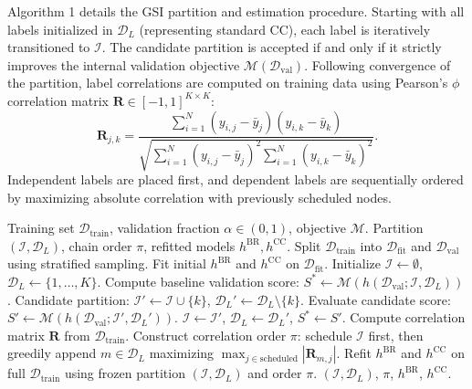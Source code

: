 \documentclass[conference]{IEEEtran}
\begin{document}
Algorithm 1 details the GSI partition and estimation procedure. Starting with all labels initialized in $\mathcal{D}_L$ (representing standard CC), each label is iteratively transitioned to $\mathcal{I}$. The candidate partition is accepted if and only if it strictly improves the internal validation objective $\mathcal{M}(\mathcal{D}_{\text{val}})$. Following convergence of the partition, label correlations are computed on training data using Pearson's $\phi$ correlation matrix $\mathbf{R} \in [-1, 1]^{K \times K}$:
\begin{equation}
    \mathbf{R}_{j, k} = \frac{\sum_{i=1}^N (y_{i,j} - \bar{y}_j)(y_{i,k} - \bar{y}_k)}{\sqrt{\sum_{i=1}^N (y_{i,j} - \bar{y}_j)^2 \sum_{i=1}^N (y_{i,k} - \bar{y}_k)^2}}.
\end{equation}
Independent labels are placed first, and dependent labels are sequentially ordered by maximizing absolute correlation with previously scheduled nodes.

\begin{algorithm}[htbp]
\caption{Greedy Selection of Independent Labels (GSI)}
\begin{algorithmic}[1]
\REQUIRE Training set $\mathcal{D}_{\text{train}}$, validation fraction $\alpha \in (0, 1)$, objective $\mathcal{M}$.
\ENSURE Partition $(\mathcal{I}, \mathcal{D}_L)$, chain order $\pi$, refitted models $h^{\text{BR}}, h^{\text{CC}}$.
\STATE Split $\mathcal{D}_{\text{train}}$ into $\mathcal{D}_{\text{fit}}$ and $\mathcal{D}_{\text{val}}$ using stratified sampling.
\STATE Fit initial $h^{\text{BR}}$ and $h^{\text{CC}}$ on $\mathcal{D}_{\text{fit}}$.
\STATE Initialize $\mathcal{I} \leftarrow \emptyset$, $\mathcal{D}_L \leftarrow \{1, \dots, K\}$.
\STATE Compute baseline validation score: $S^* \leftarrow \mathcal{M}(h(\mathcal{D}_{\text{val}}; \mathcal{I}, \mathcal{D}_L))$.
    \STATE Candidate partition: $\mathcal{I}' \leftarrow \mathcal{I} \cup \{k\}$, $\mathcal{D}_L' \leftarrow \mathcal{D}_L \setminus \{k\}$.
    \STATE Evaluate candidate score: $S' \leftarrow \mathcal{M}(h(\mathcal{D}_{\text{val}}; \mathcal{I}', \mathcal{D}_L'))$.
        \STATE $\mathcal{I} \leftarrow \mathcal{I}'$, $\mathcal{D}_L \leftarrow \mathcal{D}_L'$, $S^* \leftarrow S'$.
    \ENDIF
\ENDFOR
\STATE Compute correlation matrix $\mathbf{R}$ from $\mathcal{D}_{\text{train}}$.
\STATE Construct correlation order $\pi$: schedule $\mathcal{I}$ first, then greedily append $m \in \mathcal{D}_L$ maximizing $\max_{j \in \text{scheduled}} |\mathbf{R}_{m, j}|$.
\STATE Refit $h^{\text{BR}}$ and $h^{\text{CC}}$ on full $\mathcal{D}_{\text{train}}$ using frozen partition $(\mathcal{I}, \mathcal{D}_L)$ and order $\pi$.
\RETURN $(\mathcal{I}, \mathcal{D}_L)$, $\pi$, $h^{\text{BR}}$, $h^{\text{CC}}$.
\end{algorithmic}
\end{algorithm}
\end{document}
